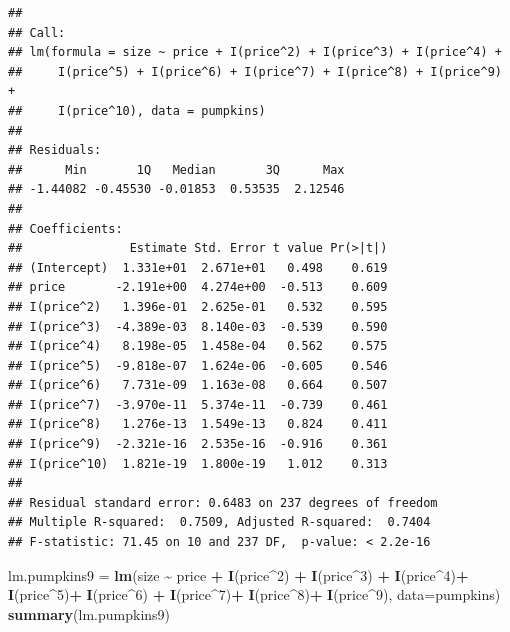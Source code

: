 \documentclass[
]{book}
\newenvironment{Shaded}{\begin{snugshade}}{\end{snugshade}}
\newcommand{\AttributeTok}[1]{\textcolor[rgb]{0.13,0.29,0.53}{#1}}
\newcommand{\DecValTok}[1]{\textcolor[rgb]{0.00,0.00,0.81}{#1}}
\newcommand{\FunctionTok}[1]{\textcolor[rgb]{0.13,0.29,0.53}{\textbf{#1}}}
\newcommand{\NormalTok}[1]{#1}
\newcommand{\OtherTok}[1]{\textcolor[rgb]{0.56,0.35,0.01}{#1}}
\newcommand{\SpecialCharTok}[1]{\textcolor[rgb]{0.81,0.36,0.00}{\textbf{#1}}}
\begin{document}
\begin{verbatim}
## 
## Call:
## lm(formula = size ~ price + I(price^2) + I(price^3) + I(price^4) + 
##     I(price^5) + I(price^6) + I(price^7) + I(price^8) + I(price^9) + 
##     I(price^10), data = pumpkins)
## 
## Residuals:
##      Min       1Q   Median       3Q      Max 
## -1.44082 -0.45530 -0.01853  0.53535  2.12546 
## 
## Coefficients:
##               Estimate Std. Error t value Pr(>|t|)
## (Intercept)  1.331e+01  2.671e+01   0.498    0.619
## price       -2.191e+00  4.274e+00  -0.513    0.609
## I(price^2)   1.396e-01  2.625e-01   0.532    0.595
## I(price^3)  -4.389e-03  8.140e-03  -0.539    0.590
## I(price^4)   8.198e-05  1.458e-04   0.562    0.575
## I(price^5)  -9.818e-07  1.624e-06  -0.605    0.546
## I(price^6)   7.731e-09  1.163e-08   0.664    0.507
## I(price^7)  -3.970e-11  5.374e-11  -0.739    0.461
## I(price^8)   1.276e-13  1.549e-13   0.824    0.411
## I(price^9)  -2.321e-16  2.535e-16  -0.916    0.361
## I(price^10)  1.821e-19  1.800e-19   1.012    0.313
## 
## Residual standard error: 0.6483 on 237 degrees of freedom
## Multiple R-squared:  0.7509, Adjusted R-squared:  0.7404 
## F-statistic: 71.45 on 10 and 237 DF,  p-value: < 2.2e-16
\end{verbatim}

\begin{Shaded}
\begin{Highlighting}[]
\NormalTok{lm.pumpkins9 }\OtherTok{=}  \FunctionTok{lm}\NormalTok{(size }\SpecialCharTok{\textasciitilde{}}\NormalTok{ price }\SpecialCharTok{+} \FunctionTok{I}\NormalTok{(price}\SpecialCharTok{\^{}}\DecValTok{2}\NormalTok{) }\SpecialCharTok{+} \FunctionTok{I}\NormalTok{(price}\SpecialCharTok{\^{}}\DecValTok{3}\NormalTok{) }\SpecialCharTok{+} \FunctionTok{I}\NormalTok{(price}\SpecialCharTok{\^{}}\DecValTok{4}\NormalTok{)}\SpecialCharTok{+} \FunctionTok{I}\NormalTok{(price}\SpecialCharTok{\^{}}\DecValTok{5}\NormalTok{)}\SpecialCharTok{+} \FunctionTok{I}\NormalTok{(price}\SpecialCharTok{\^{}}\DecValTok{6}\NormalTok{) }\SpecialCharTok{+} \FunctionTok{I}\NormalTok{(price}\SpecialCharTok{\^{}}\DecValTok{7}\NormalTok{)}\SpecialCharTok{+} \FunctionTok{I}\NormalTok{(price}\SpecialCharTok{\^{}}\DecValTok{8}\NormalTok{)}\SpecialCharTok{+} \FunctionTok{I}\NormalTok{(price}\SpecialCharTok{\^{}}\DecValTok{9}\NormalTok{), }\AttributeTok{data=}\NormalTok{pumpkins)}
\FunctionTok{summary}\NormalTok{(lm.pumpkins9)}
\end{Highlighting}
\end{Shaded}
\end{document}
